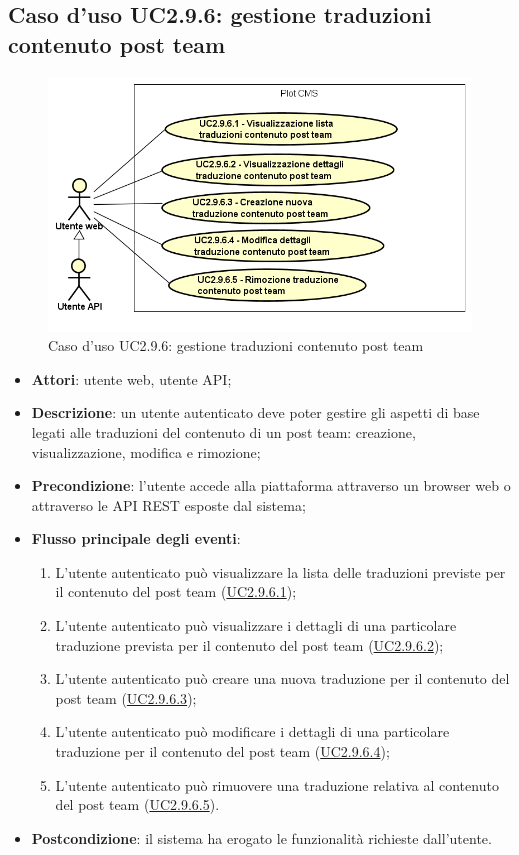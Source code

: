 \subsection{Caso d'uso UC2.9.6: gestione traduzioni contenuto post team}

        \begin{figure}[H]
            \centering
            \includegraphics[scale=0.95, width=\textwidth]{immagini/usecase/UC2-9-6.png}
            \caption{Caso d'uso UC2.9.6: gestione traduzioni contenuto post team}\label{fig:UC2.9.6} 
        \end{figure}
\begin{itemize}
\item \textbf{Attori}: utente web, utente API;
\item \textbf{Descrizione}: un utente autenticato deve poter gestire gli aspetti di base legati alle traduzioni del contenuto di un post team: creazione, visualizzazione, modifica e rimozione; 
      \item \textbf{Precondizione}: l'utente accede alla piattaforma attraverso un browser web o attraverso le API REST esposte dal sistema;

        \item \textbf{Flusso principale degli eventi}:
          \begin{enumerate}
          \item L'utente autenticato può visualizzare la lista delle traduzioni previste per il contenuto del post team (\hyperlink{UC2.9.6.1}{UC2.9.6.1});
          \item L'utente autenticato può visualizzare i dettagli di una particolare traduzione prevista per il contenuto del post team (\hyperlink{UC2.9.6.2}{UC2.9.6.2});
          \item L'utente autenticato può creare una nuova traduzione per il contenuto del post team (\hyperlink{UC2.9.6.3}{UC2.9.6.3});
          \item L'utente autenticato può modificare i dettagli di una particolare traduzione per il contenuto del post team (\hyperlink{UC2.9.6.4}{UC2.9.6.4});
          \item L'utente autenticato può rimuovere una traduzione relativa al contenuto del post team (\hyperlink{UC2.9.6.5}{UC2.9.6.5}).

      \end{enumerate}
    \item \textbf{Postcondizione}: il sistema ha erogato le funzionalità richieste dall'utente.
  \end{itemize}
